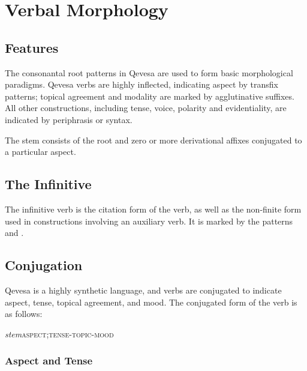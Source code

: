 \documentclass[grammar]{subfiles}
\begin{document}
  \chapter{Verbal Morphology}
  \label{ch:verbal_morphology}

  \section{Features}
  \label{sec:vm_features}

  The consonantal root patterns in Qevesa are used to form basic morphological paradigms. Qevesa verbs are highly inflected, indicating aspect by transfix patterns; topical agreement and modality are marked by agglutinative suffixes. All other constructions, including tense, voice, polarity and evidentiality, are indicated by periphrasis or syntax.

  The stem consists of the root and zero or more derivational affixes conjugated to a particular aspect. 


  \section{The Infinitive}
  \label{sec:vm_infinitive}

  The infinitive verb is the citation form of the verb, as well as the non-finite form used in constructions involving an auxiliary verb. 
  It is marked by the patterns  and  . 

  \ToBeWritten


  \section{Conjugation}
  \label{sec:vm_conjugation}

  Qevesa is a highly synthetic language, and verbs are conjugated to indicate aspect, tense, topical agreement, and mood. The conjugated form of the verb is as follows:

  \begin{exe}
    \ex\label{exe:vm_conjugation} \textit{stem}\bs\textsc{aspect;tense-topic-mood}
  \end{exe}

  \subsection{Aspect and Tense}
  \label{ssec:vm_aspect_tense}
  
\end{document}
